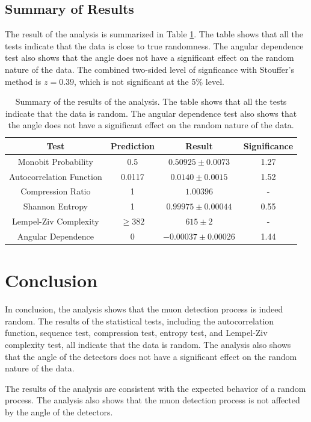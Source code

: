 \subsection{Summary of Results}
The result of the analysis is summarized in Table \ref{tab:summary}. The table shows that all the tests indicate that the data is close to true randomness. The angular dependence test also shows that the angle does not have a significant effect on the random nature of the data. The combined two-sided level of signficance with Stouffer's method \cite {stouffer1949american} is $z=0.39$, which is not significant at the 5\% level. 
\begin{table}
\centering
\begin{tabular}{|c|c|c|c|}
\hline
Test & Prediction & Result & Significance\\
\hline
Monobit Probability & 0.5 & $0.50925 \pm 0.0073$ & 1.27 \\
\hline
Autocorrelation Function & 0.0117 & $0.0140 \pm 0.0015$ & 1.52\\
\hline
Compression Ratio & 1 & $1.00396$ & - \\
\hline
Shannon Entropy & 1 & $0.99975 \pm 0.00044$ & 0.55\\
\hline
Lempel-Ziv Complexity & $\ge 382$ & $615 \pm 2$ & - \\
\hline
Angular Dependence & 0 & $-0.00037 \pm 0.00026$ & 1.44\\
\hline
\end{tabular}
\caption{Summary of the results of the analysis. The table shows that all the tests indicate that the data is random. The angular dependence test also shows that the angle does not have a significant effect on the random nature of the data.}
\label{tab:summary}
\end{table}

\section{Conclusion}
In conclusion, the analysis shows that the muon detection process is indeed random. The results of the statistical tests, including the autocorrelation function, sequence test, compression test, entropy test, and Lempel-Ziv complexity test, all indicate that the data is random. The analysis also shows that the angle of the detectors does not have a significant effect on the random nature of the data.

The results of the analysis are consistent with the expected behavior of a random process. The analysis also shows that the muon detection process is not affected by the angle of the detectors. 

